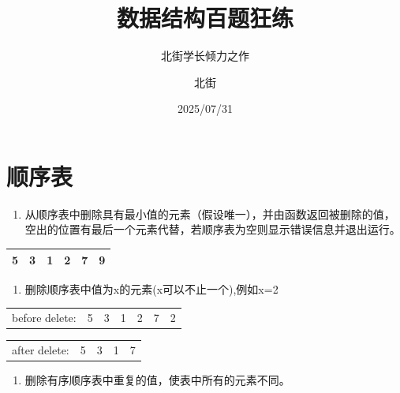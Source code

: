 \documentclass[lang=cn,newtx,10pt,scheme=chinese]{../../elegantbook}
\title{数据结构百题狂练}
\subtitle{北街学长倾力之作}
\author{北街}
\date{2025/07/31}
\begin{document}
\maketitle
\frontmatter

\tableofcontents

\mainmatter


\chapter{顺序表}



\begin{enumerate}
\def\labelenumi{\arabic{enumi}.}
\item
  
  从顺序表中删除具有最小值的元素（假设唯一），并由函数返回被删除的值，空出的位置有最后一个元素代替，若顺序表为空则显示错误信息并退出运行。
  
\end{enumerate}

\begin{table}[!htbp]
\centering
\begin{tabular}{|c|c|c|c|c|c|}
\hline
5 & 3 & 1 & 2 & 7 & 9 \\
\hline
\end{tabular}
\end{table}

\begin{enumerate}
\def\labelenumi{\arabic{enumi}.}
\setcounter{enumi}{1}
\vspace{5cm}
\item
  
  删除顺序表中值为x的元素(x可以不止一个),例如x=2
  
\end{enumerate}

\begin{table}[!htbp]
\centering
\begin{tabular}{c|c|c|c|c|c|c|}
\cline{2-7}
before delete: & 5 & 3 & 1 & 2 & 7 & 2 \\
\cline{2-7}
\end{tabular}
\end{table}

\begin{table}[!htbp]
\centering
\begin{tabular}{c|c|c|c|c|}
\cline{2-5}
after delete: & 5 & 3 & 1 & 7 \\
\cline{2-5}
\end{tabular}
\end{table}
\begin{enumerate}
\def\labelenumi{\arabic{enumi}.}
\setcounter{enumi}{2}
\vspace{5cm}
\item
  
  删除有序顺序表中重复的值，使表中所有的元素不同。
  
\end{enumerate}
\end{document}

